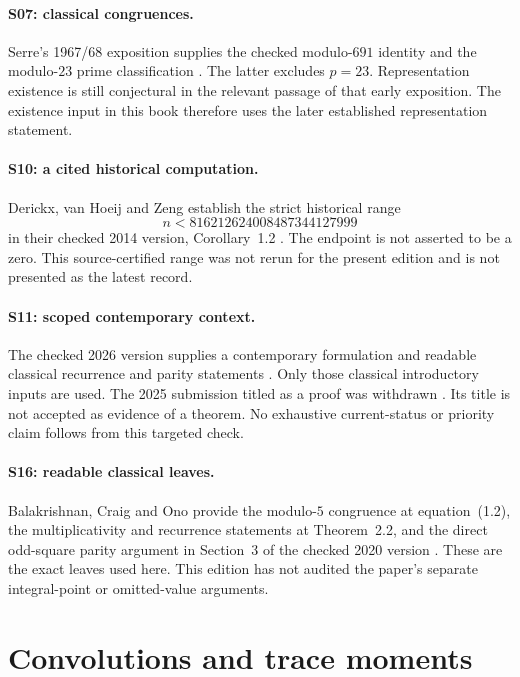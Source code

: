 \paragraph{S07: classical congruences.}
Serre's 1967/68 exposition supplies the checked modulo-$691$ identity and the modulo-$23$ prime classification \cite{SerreCongruences}. The latter excludes $p=23$. Representation existence is still conjectural in the relevant passage of that early exposition. The existence input in this book therefore uses the later established representation statement.

\paragraph{S10: a cited historical computation.}
Derickx, van Hoeij and Zeng establish the strict historical range
\[
n<816212624008487344127999
\]
in their checked 2014 version, Corollary~1.2 \cite{DHZ}. The endpoint is not asserted to be a zero. This source-certified range was not rerun for the present edition and is not presented as the latest record.

\paragraph{S11: scoped contemporary context.}
The checked 2026 version supplies a contemporary formulation and readable classical recurrence and parity statements \cite{TauContext2026}. Only those classical introductory inputs are used. The 2025 submission titled as a proof was withdrawn \cite{Withdrawn2025}. Its title is not accepted as evidence of a theorem. No exhaustive current-status or priority claim follows from this targeted check.

\paragraph{S16: readable classical leaves.}
Balakrishnan, Craig and Ono provide the modulo-$5$ congruence at equation~(1.2), the multiplicativity and recurrence statements at Theorem~2.2, and the direct odd-square parity argument in Section~3 of the checked 2020 version \cite{BCO}. These are the exact leaves used here. This edition has not audited the paper's separate integral-point or omitted-value arguments.

\section{Convolutions and trace moments}
